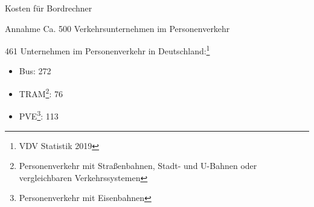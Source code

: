 
\begin{frame}{Kosten für Bordrechner}

  \begin{block}{Annahme}
    Ca. 500 Verkehrsunternehmen im Personenverkehr
  \end{block}

  461 Unternehmen im Personenverkehr in Deutschland:\footnote{VDV Statistik 2019}
  \begin{itemize}
    \item Bus: 272
    \item TRAM\footnote{Personenverkehr mit Straßenbahnen, Stadt- und U-Bahnen oder vergleichbaren Verkehrssystemen}: 76
    \item PVE\footnote{Personenverkehr mit Eisenbahnen}: 113
  \end{itemize}
\end{frame}
